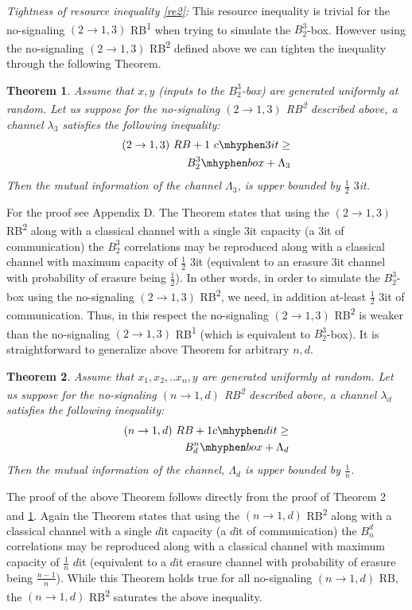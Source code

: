 \documentclass[%
 reprint,
 amsmath,amssymb,
 aps,
]{revtex4-1}
\newtheorem{mydef1}{Theorem}
\begin{document}
\textit{Tightness of resource inequality \ref{re2}:} This resource inequality is trivial for the no-signaling $(2\rightarrow 1,3)$ RB\textsuperscript{1} when trying to simulate the $B^3_2$-box. However using the no-signaling $(2\rightarrow 1,3)$ RB\textsuperscript{2} defined above we can tighten the inequality through the following Theorem.
\begin{mydef1} \label{thm6}
Assume that $x,y$ (inputs to the $ B_2^3$-box)  are generated uniformly at random. Let us suppose for the no-signaling $(2\rightarrow 1,3)$ RB\textsuperscript{2} described above, a channel $\lambda_3$ satisfies the following inequality:
\begin{eqnarray}
(2\rightarrow1,3)\ RB + 1\  c\mhyphen 3it \geq \nonumber \\ B_2^3\mhyphen box + \Lambda_3
\end{eqnarray}
Then the mutual information of the channel $\Lambda_3$,  is upper bounded by $\frac{1}{2}$ $3$it.
\end{mydef1}
For the proof see Appendix D. The Theorem states that using the $(2\rightarrow 1,3)$ RB\textsuperscript{2} along with a classical channel with a single $3$it capacity (a $3$it of communication) the $B_2^3$ correlations may be reproduced along with a classical channel with maximum capacity of $\frac{1}{2}$ $3$it (equivalent to an erasure $3$it channel with probability of erasure being $\frac{1}{2}$). In other words, in order to simulate the $B_2^3$-box using the no-signaling $(2\rightarrow 1,3)$ RB\textsuperscript{2}, we need, in addition at-least $\frac{1}{2}$ $3$it of communication. Thus, in this respect the no-signaling $(2\rightarrow 1,3)$ RB\textsuperscript{2} is weaker than the no-signaling $(2\rightarrow 1,3)$ RB\textsuperscript{1} (which is equivalent to $B^3_2$-box). It is straightforward to generalize above Theorem for arbitrary $n,d$. 
\begin{mydef1} \label{thm7}
Assume that $x_1,x_2,..x_n,y$  are generated uniformly at random. Let us suppose for the no-signaling $(n\rightarrow 1,d)$ RB\textsuperscript{2} described above, a channel $\lambda_d$ satisfies the following inequality:
\begin{eqnarray}
(n\rightarrow1,d)\ RB + 1  c \mhyphen dit \geq \nonumber \\ B_d^n\mhyphen box + \Lambda_d
\end{eqnarray}
Then the mutual information of the channel, $\Lambda_d$ is upper bounded by $\frac{1}{n}$.
\end{mydef1}
The proof of the above Theorem follows directly from the proof of Theorem 2 and \ref{thm6}. Again the Theorem states that using the $(n\rightarrow 1,d)$ RB\textsuperscript{2} along with a classical channel with a single $d$it capacity (a $d$it of communication) the $B_n^d$ correlations may be reproduced along with a classical channel with maximum capacity of $\frac{1}{n}$ $d$it (equivalent to a $d$it erasure channel with probability of erasure being $\frac{n-1}{n}$). While this Theorem holds true for all no-signaling $(n\rightarrow1,d)$ RB, the $(n\rightarrow1,d)$ RB\textsuperscript{2} saturates the above inequality.
\end{document}
